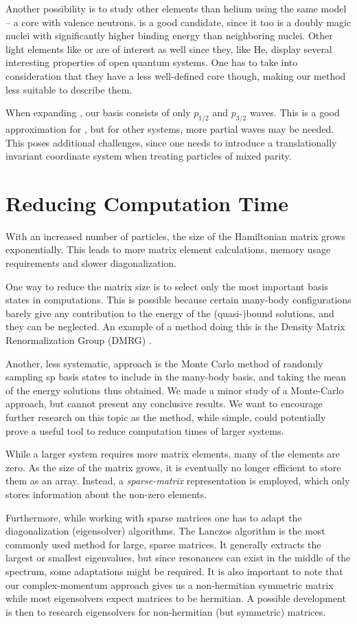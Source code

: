 \documentclass[../main/report.tex]{subfiles}
\begin{document}
Another possibility is to study other elements than helium using the same model -- a core with valence neutrons.  is a good candidate, since it too is a doubly magic nuclei with significantly higher binding energy than neighboring nuclei.
Other light elements like  or  are of interest as well since they, like He, display several interesting properties of open quantum systems. One has to take into consideration that they have a less well-defined core though, making our method less suitable to describe them.

When expanding , our basis consists of only $p_{1/2}$ and $p_{3/2}$ waves. 
This is a good approximation for  \cite{gamow_shell_model_2008},  but for other systems, more partial waves may be needed.
This poses additional challenges, since one needs to introduce a translationally invariant coordinate system when treating particles of mixed parity. 

\section{Reducing Computation Time}
With an increased number of particles, the size of the Hamiltonian matrix grows exponentially. This leads to more matrix element calculations, memory usage requirements and slower diagonalization.

One way to reduce the matrix size is to select only the most important basis states in computations.
This is possible because certain many-body configurations barely give any contribution to the energy of the (quasi-)bound solutions, and they can be neglected. 
An example of a method doing this is the Density Matrix Renormalization Group (DMRG) \cite{DMRG}.

Another, less systematic, approach is the Monte Carlo method of randomly sampling sp basis states to include in the many-body basis, and taking the mean of the energy solutions thus obtained.
We made a minor study of a Monte-Carlo approach, but cannot present any conclusive results.
We want to encourage further research on this topic as the method, while simple, could potentially prove a useful tool to reduce computation times of larger systems.

While a larger system requires more matrix elements, many of the elements are zero. 
As the size of the matrix grows, it is eventually no longer efficient to store them as an array. 
Instead, a \emph{sparse-matrix} representation is employed, which only stores information about the non-zero elements. 

Furthermore, while working with sparse matrices one has to adapt the diagonalization (eigensolver) algorithms. 
The Lanczos algorithm is the most commonly used method for large, sparse matrices.
It generally extracts the largest or smallest eigenvalues, but since resonances can exist in the middle of the spectrum, some adaptations might be required.
It is also important to note that our complex-momentum approach gives us a non-hermitian symmetric matrix while most eigensolvers expect matrices to be hermitian. A possible development is then to research eigensolvers for non-hermitian (but symmetric) matrices.
\end{document}
